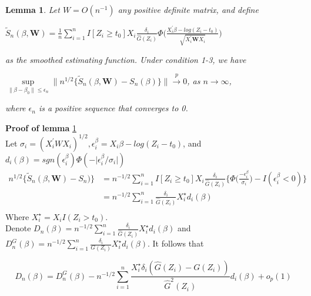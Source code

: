 \documentclass[titlepage,english,12pt]{article}
\newtheorem{lemma}[theorem]{Lemma}
\begin{document}
	\begin{lemma} \label{lemma:1}
		Let $ W=O(n^{-1})$ any positive definite matrix, and define
		\begin{center}
			$\tilde{S}_n(\beta, \textbf{W})=\frac{1}{n} \sum_{i=1}^{n} I[Z_i \geq t_0] X_i \frac{\delta_i}{\hat{G}(Z_i)}\Phi\Big(\frac{X_i^\prime\beta-log(Z_i-t_0)}{\sqrt{X_i^{\prime} \textbf{W}X_{i}}}\Big)$
		\end{center}
		as the smoothed estimating function. Under condition 1-3, we have
		\begin{center}
			$\sup\limits_{\lVert \beta - \beta_0 \rVert \leq \epsilon_n} \lVert {n^{1/2}} \{ \tilde{S}_n(\beta, \textbf{W})-S_n(\beta) \} \rVert \xrightarrow{p} 0$, as $n\to\infty$,		
		\end{center}
		where ${\epsilon_n}$ is a positive sequence that converges to 0.
	\end{lemma}

	\noindent \textbf{Proof of lemma} \ref{lemma:1}\\
	Let $\sigma_i=(X_i^\prime W X_i)^{1/2}, \epsilon_i^\beta=X_i\beta-log(Z_i-t_0)$, and $d_i(\beta)=sgn(\epsilon_i^\beta)\Phi(-\lvert\epsilon_i^\beta/\sigma_i\rvert)$\\
	\begin{align*}
	n^{1/2}\{ \tilde{S}_n(\beta, \textbf{W})-S_n)\} & = n^{-1/2} \sum_{i=1}^{n}I[Z_i \geq t_0] X_i \frac{\delta_i}{\hat{G}(Z_i)}\bigg\{ \Phi \bigg(\frac{-\epsilon_i^\beta}{\sigma_i}\bigg)-I(\epsilon_i^\beta<0) \bigg\}\\
	& = n^{-1/2} \sum_{i=1}^{n} \frac{\delta_i}{\hat{G}(Z_i)} X_i^\star d_i(\beta)\\
	\end{align*}
	\noindent Where $X_i^\star = X_i I(Z_i>t_0)$.\\
	
	\noindent Denote $D_n(\beta)=n^{-1/2} \sum_{i=1}^{n}\frac{\delta_i}{\hat{G}(Z_i)} X_i^\star d_i(\beta)$ and $D_n^G(\beta)=n^{-1/2} \sum_{i=1}^{n} \frac{\delta_i}{G(Z_i)} X_i^\star d_i(\beta)$. It follows that
	
	\begin{equation} \label{eq:10}
	D_n(\beta)=D_n^G(\beta)-n^{-1/2} \sum_{i=1}^{n}\frac{X_i^\star\delta_i(\hat{G}(Z_i)-G(Z_i))}{\hat{G}^2(Z_i)}d_i(\beta)+o_p(1)
	\end{equation}
	
\end{document}
